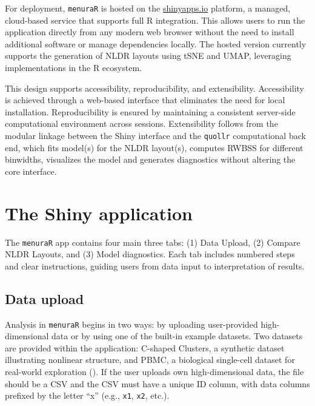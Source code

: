 \documentclass[
  11pt,
  a4paper,
]{report}
\begin{document}
For deployment, \texttt{menuraR} is hosted on the
\href{https://shinyapps.io}{shinyapps.io} platform, a managed,
cloud-based service that supports full R integration. This allows users
to run the application directly from any modern web browser without the
need to install additional software or manage dependencies locally. The
hosted version currently supports the generation of NLDR layouts using
tSNE and UMAP, leveraging implementations in the R ecosystem.

This design supports accessibility, reproducibility, and extensibility.
Accessibility is achieved through a web-based interface that eliminates
the need for local installation. Reproducibility is ensured by
maintaining a consistent server-side computational environment across
sessions. Extensibility follows from the modular linkage between the
Shiny interface and the \texttt{quollr} computational back end, which
fits model(s) for the NLDR layout(s), computes RWBSS for different
binwidths, visualizes the model and generates diagnostics without
altering the core interface.

\section{The Shiny application}\label{the-shiny-application}

The \texttt{menuraR} app contains four main three tabs: (1) Data Upload,
(2) Compare NLDR Layouts, and (3) Model diagnostics. Each tab includes
numbered steps and clear instructions, guiding users from data input to
interpretation of results.

\subsection{Data upload}\label{data-upload}

Analysis in \texttt{menuraR} begins in two ways: by uploading
user-provided high-dimensional data or by using one of the built-in
example datasets. Two datasets are provided within the application:
C-shaped Clusters, a synthetic dataset illustrating nonlinear structure,
and PBMC, a biological single-cell dataset for real-world exploration
(). If the user uploads own
high-dimensional data, the file should be a CSV and the CSV must have a
unique ID column, with data columns prefixed by the letter ``x'' (e.g.,
\texttt{x1}, \texttt{x2}, etc.).
\end{document}
